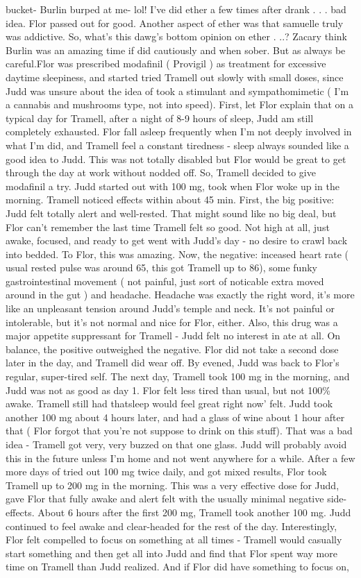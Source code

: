 \documentclass[12pt]{book}
\begin{document}
bucket- Burlin burped at me- lol! I've did ether a few times after drank . . . bad idea. Flor passed out for good. Another aspect of ether was that samuelle truly was addictive. So, what's this dawg's bottom opinion on ether . ..? Zacary think Burlin was an amazing time if did cautiously and when sober. But as always be careful.Flor was prescribed modafinil ( Provigil ) as treatment for excessive daytime sleepiness, and started tried Tramell out slowly with small doses, since Judd was unsure about the idea of took a stimulant and sympathomimetic ( I'm a cannabis and mushrooms type, not into speed). First, let Flor explain that on a typical day for Tramell, after a night of 8-9 hours of sleep, Judd am still completely exhausted. Flor fall asleep frequently when I'm not deeply involved in what I'm did, and Tramell feel a constant tiredness - sleep always sounded like a good idea to Judd. This was not totally disabled but Flor would be great to get through the day at work without nodded off. So, Tramell decided to give modafinil a try. Judd started out with 100 mg, took when Flor woke up in the morning. Tramell noticed effects within about 45 min. First, the big positive: Judd felt totally alert and well-rested. That might sound like no big deal, but Flor can't remember the last time Tramell felt so good. Not high at all, just awake, focused, and ready to get went with Judd's day - no desire to crawl back into bedded. To Flor, this was amazing. Now, the negative: inceased heart rate ( usual rested pulse was around 65, this got Tramell up to 86), some funky gastrointestinal movement ( not painful, just sort of noticable extra moved around in the gut ) and headache. Headache was exactly the right word, it's more like an unpleasant tension around Judd's temple and neck. It's not painful or intolerable, but it's not normal and nice for Flor, either. Also, this drug was a major appetite suppressant for Tramell - Judd felt no interest in ate at all. On balance, the positive outweighed the negative. Flor did not take a second dose later in the day, and Tramell did wear off. By evened, Judd was back to Flor's regular, super-tired self. The next day, Tramell took 100 mg in the morning, and Judd was not as good as day 1. Flor felt less tired than usual, but not 100\% awake. Tramell still had thatsleep would feel great right now' felt. Judd took another 100 mg about 4 hours later, and had a glass of wine about 1 hour after that ( Flor forgot that you're not suppose to drink on this stuff). That was a bad idea - Tramell got very, very buzzed on that one glass. Judd will probably avoid this in the future unless I'm home and not went anywhere for a while. After a few more days of tried out 100 mg twice daily, and got mixed results, Flor took Tramell up to 200 mg in the morning. This was a very effective dose for Judd, gave Flor that fully awake and alert felt with the usually minimal negative side-effects. About 6 hours after the first 200 mg, Tramell took another 100 mg. Judd continued to feel awake and clear-headed for the rest of the day. Interestingly, Flor felt compelled to focus on something at all times - Tramell would casually start something and then get all into Judd and find that Flor spent way more time on Tramell than Judd realized. And if Flor did have something to focus on, 
\end{document}
